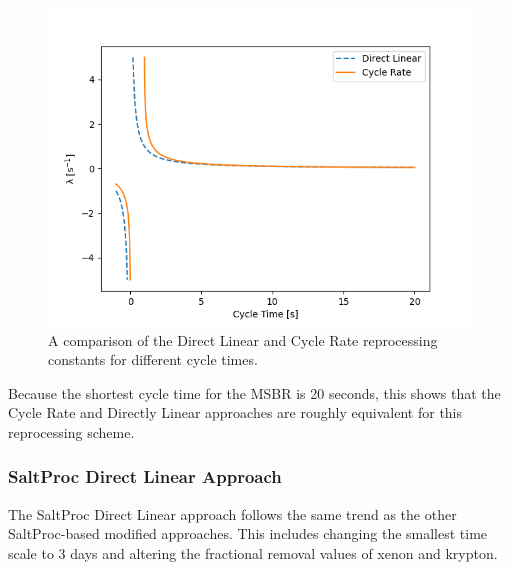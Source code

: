 \begin{figure}[H]
  \centering
  \includegraphics[scale=0.55]{images/dl_cr_asymptote.png}
  \caption{A comparison of the Direct Linear and Cycle Rate reprocessing constants for different cycle times.}
   \label{fig:dl_cr_asymptotic}
\end{figure}

Because the shortest cycle time for the MSBR is 20 seconds, this shows that the Cycle Rate and Directly Linear approaches are roughly equivalent for this reprocessing scheme.



\subsubsection{SaltProc Direct Linear Approach}

The SaltProc Direct Linear approach follows the same trend as the other SaltProc-based modified approaches. This includes changing the smallest time scale to 3 days and altering the fractional removal values of xenon and krypton.

